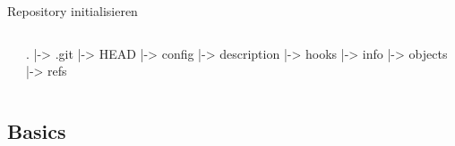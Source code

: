 \begin{frame}[fragile]
    \slidehead
    Repository initialisieren
    \begin{columns}[c]
        \begin{column}{.5\textwidth}
            \centering
        \end{column}
        \begin{column}{.5\textwidth}
            \centering
            \begin{codeBlock}[]{}
                .
                |-> .git
                    |-> HEAD
                    |-> config
                    |-> description
                    |-> hooks
                    |-> info
                    |-> objects
                    |-> refs
            \end{codeBlock}
        \end{column}
    \end{columns}
\end{frame}

\subsection{Basics}\label{subsec:basics}

